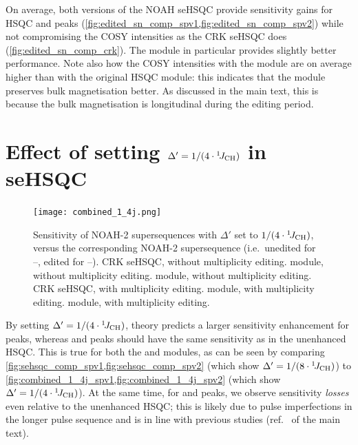 On average, both versions of the NOAH seHSQC provide sensitivity gains for HSQC  and  peaks (\cref{fig:edited_sn_comp_spv1,fig:edited_sn_comp_spv2}) while not compromising the COSY intensities as the CRK seHSQC does (\cref{fig:edited_sn_comp_crk}).
The \noahSpb{} module in particular provides slightly better performance.
Note also how the COSY intensities with the \noahSpb{} module are on average higher than with the original HSQC module: this indicates that the \noahSpb{} module preserves bulk  magnetisation better.
As discussed in the main text, this is because the bulk magnetisation is longitudinal during the editing period.

\section{Effect of setting \texorpdfstring{$\Delta' = 1/(4\cdot\onejch)$}{Delta' = 1/(4*1JCH)} in seHSQC}

\begin{figure}
    \centering
    \texttt{[image: combined\_1\_4j.png]}
    {\label{fig:combined_1_4j_crk}}
    {\label{fig:combined_1_4j_spv1}}
    {\label{fig:combined_1_4j_spv2}}
    {\label{fig:combined_1_4j_ed_crk}}
    {\label{fig:combined_1_4j_ed_spv1}}
    {\label{fig:combined_1_4j_ed_spv2}}
    \caption{
        Sensitivity of NOAH-2  supersequences with $\Delta'$ set to $1/(4\cdot\onejch)$, versus the corresponding NOAH-2  supersequence (i.e.\ unedited for --, edited for --).
        \textbf{} CRK seHSQC, without multiplicity editing.
        \textbf{} \noahSpa{} module, without multiplicity editing.
        \textbf{} \noahSpb{} module, without multiplicity editing.
        \textbf{} CRK seHSQC, with multiplicity editing.
        \textbf{} \noahSpa{} module, with multiplicity editing.
        \textbf{} \noahSpb{} module, with multiplicity editing.
        \andro{}
    }
    \label{fig:combined_1_4j}
\end{figure}

By setting $\Delta' = 1/(4\cdot\onejch)$, theory predicts a larger sensitivity enhancement for  peaks, whereas  and  peaks should have the same sensitivity as in the unenhanced HSQC.
This is true for both the \noahSpa{} and \noahSpb{} modules, as can be seen by comparing \cref{fig:sehsqc_comp_spv1,fig:sehsqc_comp_spv2} (which show $\Delta' = 1/(8\cdot\onejch)$) to \cref{fig:combined_1_4j_spv1,fig:combined_1_4j_spv2} (which show $\Delta' = 1/(4\cdot\onejch)$).
At the same time, for  and  peaks, we observe sensitivity \textit{losses} even relative to the unenhanced HSQC; this is likely due to pulse imperfections in the longer pulse sequence and is in line with previous studies (ref.\  of the main text).

